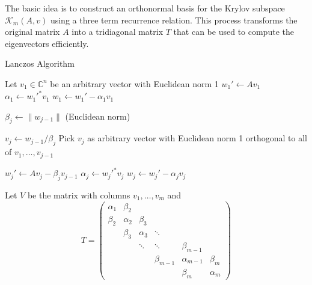   \begin{algo} 
    The basic idea is to construct an orthonormal basis for the Krylov subspace $\mathcal{K}_m (A, v)$ using a three term recurrence relation. This process transforms the original matrix $A$ into a tridiagonal matrix $T$ that can be used to compute the eigenvectors efficiently.  
    
    \begin{algorithm}[H]
      \caption{Lanczos Algorithm}
      \label{alg:lanczos}
      \begin{algorithmic}[1]
            
        
        \State Let $v_1 \in \mathbb{C}^n$ be an arbitrary vector with Euclidean norm 1
        \State $w_1' \gets A v_1$
        \State $\alpha_1 \gets {w_1'}^* v_1$
        \State $w_1 \gets w_1' - \alpha_1 v_1$
        
          \State $\beta_j \gets \|w_{j-1}\|$ (Euclidean norm)
          
            \State $v_j \gets w_{j-1} / \beta_j$
          \Else
            \State Pick $v_j$ as arbitrary vector with Euclidean norm 1 orthogonal to all of $v_1, \ldots, v_{j-1}$
          \EndIf
          
          \State $w_j' \gets A v_j - \beta_j v_{j-1}$
          \State $\alpha_j \gets {w_j'}^* v_j$
          \State $w_j \gets w_j' - \alpha_j v_j$
        \EndFor
        
        \State Let $V$ be the matrix with columns $v_1, \ldots, v_m$ and 
        \begin{equation}
          T = \begin{pmatrix}
            \alpha_1 & \beta_2 & & & \\
            \beta_2 & \alpha_2 & \beta_3 & & \\
            & \beta_3 & \alpha_3 & \ddots & \\
            & & \ddots & \ddots & \beta_{m-1} \\
            & & & \beta_{m-1} & \alpha_{m-1} & \beta_m \\
            & & & & \beta_m & \alpha_m
          \end{pmatrix}
        \end{equation}
        

\end{algorithmic}
\end{algorithm}
\end{algo}
